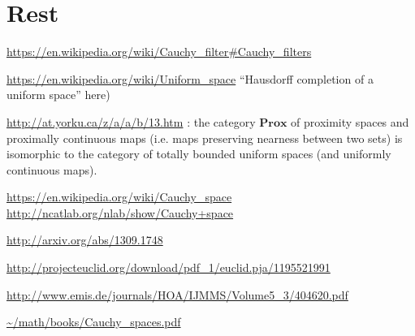 \section{Rest}

\url{https://en.wikipedia.org/wiki/Cauchy\_filter\#Cauchy\_filters}

\url{https://en.wikipedia.org/wiki/Uniform\_space} ``Hausdorff completion of a
uniform space'' here)

\url{http://at.yorku.ca/z/a/a/b/13.htm} : the category $\mathbf{Prox}$ of proximity
spaces and proximally continuous maps (i.e. maps preserving nearness between
two sets) is isomorphic to the category of totally bounded uniform spaces (and
uniformly continuous maps).

\url{https://en.wikipedia.org/wiki/Cauchy\_space}
\url{http://ncatlab.org/nlab/show/Cauchy+space}

\url{http://arxiv.org/abs/1309.1748}

\url{http://projecteuclid.org/download/pdf\_1/euclid.pja/1195521991}

\url{http://www.emis.de/journals/HOA/IJMMS/Volume5\_3/404620.pdf}

\url{\~/math/books/Cauchy\_spaces.pdf}
